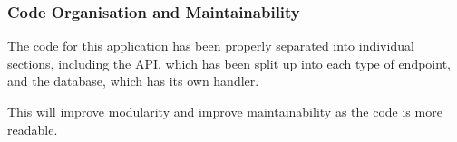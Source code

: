 \subsubsection{Code Organisation and Maintainability}
The code for this application has been properly separated into individual sections, including the API, which has been split up into each type of endpoint, and the database, which has its own handler.

This will improve modularity and improve maintainability as the code is more readable.









